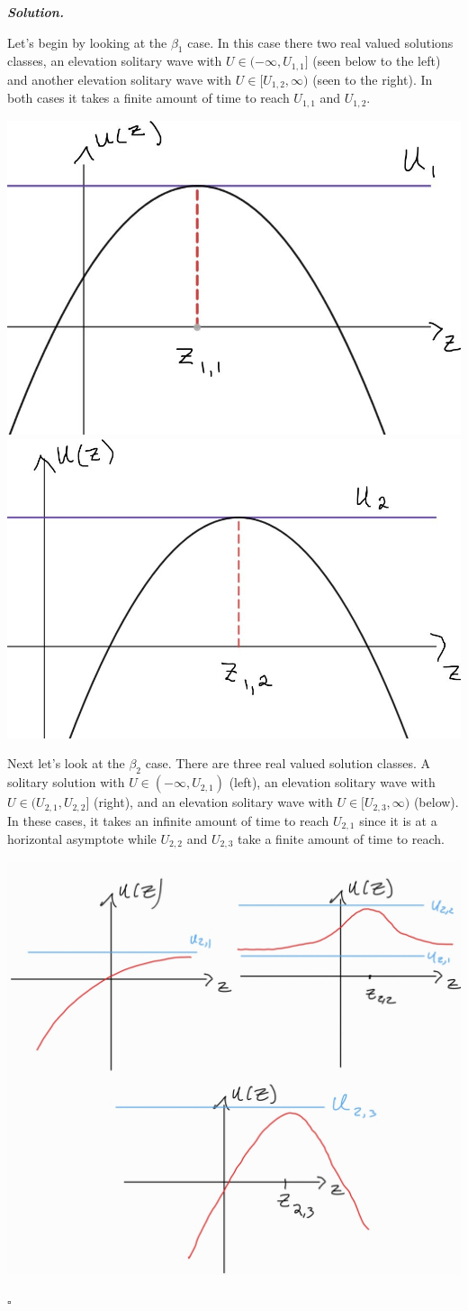 \documentclass[12pt]{report}
\newenvironment{solution}[1][\it{Solution}]{\textbf{#1. } }{$\square$}
\begin{document}
\begin{solution}
\begin{enumerate}
        \noindent
        Let's begin by looking at the $\beta_1$ case. In this case there two real valued solutions classes, an elevation solitary wave with $U \in (-\infty, U_{1,1}]$ (seen below to the left) and another elevation solitary wave with $U \in [U_{1,2}, \infty)$ (seen to the right). In both cases it takes a finite amount of time to reach $U_{1,1}$ and $U_{1,2}$.
        \begin{center}
            \includegraphics[width=.4\textwidth]{plots/4b-2.JPG}
            \qquad
            \includegraphics[width=.4\textwidth]{plots/4b-3.JPG}
        \end{center}

        \noindent
        Next let's look at the $\beta_2$ case. There are three real valued solution classes. A solitary solution with $U \in (-\infty,U_{2,1})$ (left), an elevation solitary wave with $U \in (U_{2,1},U_{2,2}]$ (right), and an elevation solitary wave with $U \in [U_{2,3}, \infty)$ (below). In these cases, it takes an infinite amount of time to reach $U_{2,1}$ since it is at a horizontal asymptote while $U_{2,2}$ and $U_{2,3}$ take a finite amount of time to reach.

        \begin{center}
            \includegraphics[width=.6\textwidth]{plots/4b-set1.jpg}
        \end{center}


\end{enumerate}
\end{solution}
\end{document}
